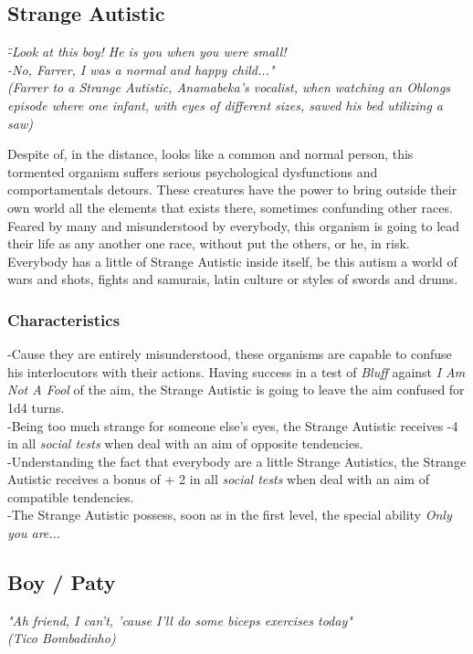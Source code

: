 \documentclass[ letterpaper,12pt]{article}
\begin{document}
\subsection{Strange Autistic}
{\it \" -Look at this boy! He is you when you were small!\\
 -No, Farrer, I was a normal and happy child..."\\
(Farrer to a Strange Autistic, Anamabeka's vocalist, when watching an Oblongs episode where one infant, with eyes of different sizes, sawed his bed utilizing a saw)\\}

Despite of, in the distance, looks like a common and normal person, this
tormented organism suffers serious psychological dysfunctions and
comportamentals detours. These creatures have the power to bring outside their
own world all the elements that exists there, sometimes confunding other races.
Feared by many and misunderstood by everybody, this organism is going to lead
their life as any another one race, without put the others, or he, in risk.
Everybody has a little of Strange Autistic inside itself, be this autism a
world of wars and shots, fights and samurais, latin culture or styles of swords
and drums.

\subsubsection{Characteristics}
-Cause they are entirely misunderstood, these organisms are capable to confuse his interlocutors with their actions. Having success in a test of {\it Bluff} against {\it I Am Not A Fool} of the aim, the Strange Autistic is going to leave the aim confused for 1d4 turns.\\
-Being too much strange for someone else's eyes, the Strange Autistic receives -4 in all {\it social tests} when deal with an aim of opposite tendencies. \\
-Understanding the fact that everybody are a little Strange Autistics, the Strange Autistic receives a bonus of + 2 in all {\it social tests} when deal with an aim of compatible tendencies.\\
-The Strange Autistic possess, soon as in the first level, the special ability {\it Only you are...}\\

\subsection{Boy / Paty}
{\it "Ah friend, I can't, 'cause I'll do some biceps exercises today"\\
(Tico Bombadinho)\\}
\end{document}
